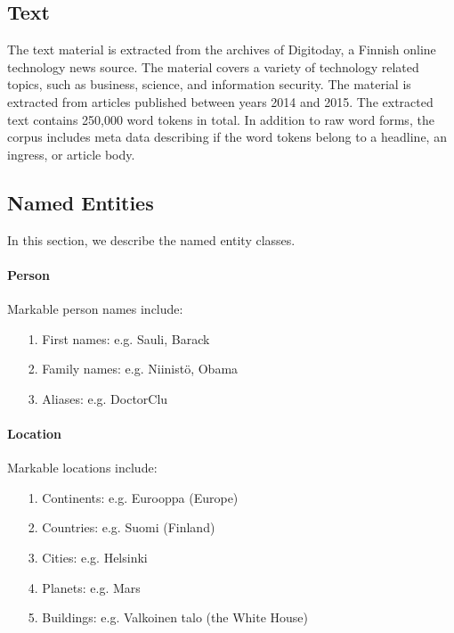\documentclass[11pt]{article}
\begin{document}
\subsection{Text}
\label{sec: text}

The text material is extracted from the archives of Digitoday, a Finnish online technology news source. The material covers a variety of technology related topics, such as business, science, and information security.  The material is extracted from articles published between years 2014 and 2015. The extracted text contains 250,000 word tokens in total. In addition to raw word forms, the corpus includes meta data describing if the word tokens belong to a headline, an ingress, or article body. 


\subsection{Named Entities}
\label{sec: named entities}

In this section, we describe the named entity classes.



\paragraph{Person}

Markable person names include:

\begin{itemize}

\item[1.] First names: e.g. Sauli, Barack
\item[2.] Family names: e.g. Niinist\"o, Obama
\item[3.] Aliases: e.g. DoctorClu

\end{itemize}



\paragraph{Location}

Markable locations include:

\begin{itemize}

\item[1.] Continents: e.g. Eurooppa (Europe)
\item[2.] Countries: e.g. Suomi (Finland)
\item[3.] Cities: e.g. Helsinki
\item[4.] Planets: e.g. Mars
\item[5.] Buildings: e.g. Valkoinen talo (the White House)

\end{itemize}
\end{document}
